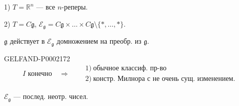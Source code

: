 1) $T=\mathbb R^n$ --- все $n$-реперы.



2) $T=C\mathfrak g$, $\mathcal E_{\mathfrak g}=C\mathfrak g\times\ldots\times C\mathfrak g\setminus\{\ast,\ldots,\ast\}$.



$\mathfrak g$ действует в $\mathcal E_{\mathfrak g}$ домножением на преобр. из $\mathfrak g$.



\begin{GelfandAdjacentEvidence}{GELFAND-P000217}{2}
\begin{equation*}
I\text{ конечно}\quad\Rightarrow\quad
\begin{aligned}
&1)\ \text{обычное классиф. пр-во}\\
&2)\ \text{констр. Милнора с не очень сущ. изменением.}
\end{aligned}
\end{equation*}







\end{GelfandAdjacentEvidence}

$\mathcal E_{\mathfrak g}$ --- послед. неотр. чисел.



